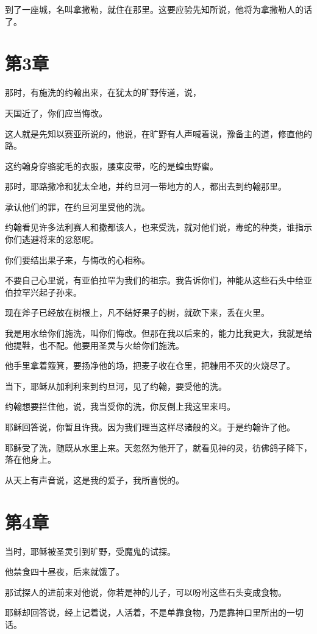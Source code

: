 \documentclass[12pt,oneside]{book}
\begin{document}
到了一座城，名叫拿撒勒，就住在那里。这要应验先知所说，他将为拿撒勒人的话了。


\chapter{第3章}
那时，有施洗的约翰出来，在犹太的旷野传道，说，

天国近了，你们应当悔改。

这人就是先知以赛亚所说的，他说，在旷野有人声喊着说，豫备主的道，修直他的路。

这约翰身穿骆驼毛的衣服，腰束皮带，吃的是蝗虫野蜜。

那时，耶路撒冷和犹太全地，并约旦河一带地方的人，都出去到约翰那里。

承认他们的罪，在约旦河里受他的洗。

约翰看见许多法利赛人和撒都该人，也来受洗，就对他们说，毒蛇的种类，谁指示你们逃避将来的忿怒呢。

你们要结出果子来，与悔改的心相称。

不要自己心里说，有亚伯拉罕为我们的祖宗。我告诉你们，神能从这些石头中给亚伯拉罕兴起子孙来。

现在斧子已经放在树根上，凡不结好果子的树，就砍下来，丢在火里。

我是用水给你们施洗，叫你们悔改。但那在我以后来的，能力比我更大，我就是给他提鞋，也不配。他要用圣灵与火给你们施洗。

他手里拿着簸箕，要扬净他的场，把麦子收在仓里，把糠用不灭的火烧尽了。

当下，耶稣从加利利来到约旦河，见了约翰，要受他的洗。

约翰想要拦住他，说，我当受你的洗，你反倒上我这里来吗。

耶稣回答说，你暂且许我。因为我们理当这样尽诸般的义。于是约翰许了他。

耶稣受了洗，随既从水里上来。天忽然为他开了，就看见神的灵，彷佛鸽子降下，落在他身上。

从天上有声音说，这是我的爱子，我所喜悦的。

\chapter{第4章}
当时，耶稣被圣灵引到旷野，受魔鬼的试探。

他禁食四十昼夜，后来就饿了。

那试探人的进前来对他说，你若是神的儿子，可以吩咐这些石头变成食物。

耶稣却回答说，经上记着说，人活着，不是单靠食物，乃是靠神口里所出的一切话。
\end{document}
